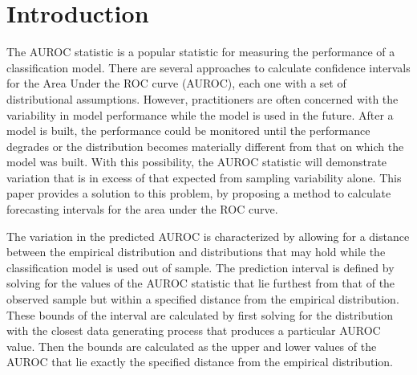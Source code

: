 

\section{Introduction}



The AUROC statistic is a popular statistic for measuring the performance of a classification model.
There are several approaches to calculate confidence intervals for the Area Under the ROC curve (AUROC), each one with a set of distributional assumptions.
However, practitioners are often concerned with the variability in model performance while the model is used in the future.
After a model is built, the performance could be monitored until the performance degrades or the distribution becomes materially different from that on which the model was built.
With this possibility, the AUROC statistic will demonstrate variation that is in excess of that expected from sampling variability alone.
This paper provides a solution to this problem, by proposing a method to calculate forecasting intervals for the area under the ROC curve.

The variation in the predicted AUROC is characterized by allowing for a distance between the empirical distribution and distributions that may hold while the classification model is used out of sample.
The prediction interval is defined by solving for the values of the AUROC statistic that lie furthest from that of the observed sample but within a specified distance from the empirical distribution.
These bounds of the interval are calculated by first
solving for the distribution with
the closest data generating process
that produces a particular AUROC value.
%
Then the bounds are calculated as the upper and lower values of the AUROC that lie exactly the specified distance from the empirical distribution.


